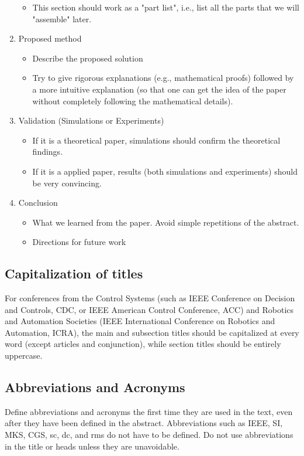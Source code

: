 \documentclass[letterpaper, 10 pt, conference]{ieeeconf}
\begin{document}
\begin{enumerate}
\begin{itemize}
  \item This section should work as a "part list", i.e., list all the parts that we will "assemble" later.
  \end{itemize}
\item Proposed method
  \begin{itemize}
  \item Describe the proposed solution
  \item Try to give rigorous explanations (e.g., mathematical proofs) followed by a more intuitive explanation (so that one can get the idea of the paper without completely following the mathematical details).
  \end{itemize}
\item Validation (Simulations or Experiments)
  \begin{itemize}
  \item If it is a theoretical paper, simulations should confirm the theoretical findings.
  \item If it is a applied paper, results (both simulations and experiments) should be very convincing.
  \end{itemize}
\item Conclusion
  \begin{itemize}
  \item What we learned from the paper. Avoid simple repetitions of the abstract.
  \item Directions for future work
  \end{itemize}
\end{enumerate}

\subsection{Capitalization of titles}
For conferences from the Control Systems (such as IEEE Conference on Decision and Controls, CDC, or IEEE American Control Conference, ACC) and Robotics and Automation Societies (IEEE International Conference on Robotics and Automation, ICRA), the main and subsection titles should be capitalized at every word (except articles and conjunction), while section titles should be entirely uppercase.

\subsection{Abbreviations and Acronyms}\label{sec:abbreviations}
Define abbreviations and acronyms the first time they are used in the text, even after they have been defined in the abstract. Abbreviations such as IEEE, SI, MKS, CGS, sc, dc, and rms do not have to be defined. Do not use abbreviations in the title or heads unless they are unavoidable.
\end{document}
